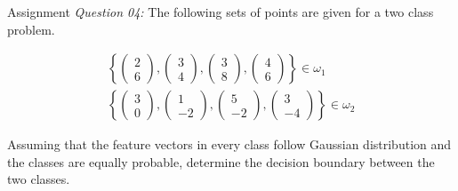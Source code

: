 \begin{frame}{Assignment}
\textit{\color{slidecolor}Question 04:}
The following sets of points are given for a two class problem.
\begin{scriptsize}
\begin{equation}
\begin{array}{l}
\left\{ {\left( {\begin{array}{*{20}{c}}
2\\
6
\end{array}} \right),\left( {\begin{array}{*{20}{c}}
3\\
4
\end{array}} \right),\left( {\begin{array}{*{20}{c}}
3\\
8
\end{array}} \right),\left( {\begin{array}{*{20}{c}}
4\\
6
\end{array}} \right)} \right\} \in \omega_1\\
\left\{ {\left( {\begin{array}{*{20}{c}}
3\\
0
\end{array}} \right),\left( {\begin{array}{*{20}{c}}
1\\
-2
\end{array}} \right),\left( {\begin{array}{*{20}{c}}
5\\
-2
\end{array}} \right),\left( {\begin{array}{*{20}{c}}
3\\
-4
\end{array}} \right)} \right\} \in \omega_2
\end{array}\nonumber
\end{equation}
\end{scriptsize}
Assuming that the feature vectors in every class follow Gaussian distribution and the classes are equally probable, determine the decision boundary between the two classes.
\end{frame}




